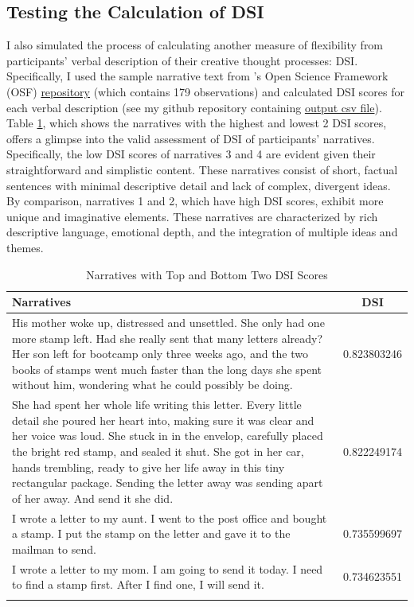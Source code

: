 \documentclass[../Proposal.tex]{subfiles}
\begin{document}
\subsection*{Testing the Calculation of DSI}
I also simulated the process of calculating another measure of flexibility from participants' verbal description of their creative thought processes: DSI. Specifically, I used the sample narrative text from \textcite{johnson_divergent_2022}'s Open Science Framework (OSF) \href{https://osf.io/ath2s/}{repository} (which contains 179 observations) and calculated DSI scores for each verbal description (see my github repository containing \href{https://github.com/cty20010831/UChicago_MA_Thesis_Divergent-Semantic-Integration/blob/bdd32706afb7ba8e72f07b3b10d1eaa9fe8b4331/user_text/DSI_output.csv.csv}{output csv file}). Table \ref{tab: narratives with top and bottom 2 DSI scores}, which shows the narratives with the highest and lowest 2 DSI scores, offers a glimpse into the valid assessment of DSI of participants' narratives. Specifically, the low DSI scores of narratives 3 and 4 are evident given their straightforward and simplistic content. These narratives consist of short, factual sentences with minimal descriptive detail and lack of complex, divergent ideas. By comparison, narratives 1 and 2, which have high DSI scores, exhibit more unique and imaginative elements. These narratives are characterized by rich descriptive language, emotional depth, and the integration of multiple ideas and themes. 

\begin{longtable}{|p{13cm}|c|}
    \hline
    Narratives & DSI \\ 
    \hline
    His mother woke up, distressed and unsettled. She only had one more stamp left. Had she really sent that many letters already? Her son left for bootcamp only three weeks ago, and the two books of stamps went much faster than the long days she spent without him, wondering what he could possibly be doing. & 0.823803246 \\ 
    \hline
    She had spent her whole life writing this letter. Every little detail she poured her heart into, making sure it was clear and her voice was loud. She stuck in in the envelop, carefully placed the bright red stamp, and sealed it shut. She got in her car, hands trembling, ready to give her life away in this tiny rectangular package. Sending the letter away was sending apart of her away. And send it she did. & 0.822249174 \\
    \hline
    I wrote a letter to my aunt. I went to the post office and bought a stamp. I put the stamp on the letter and gave it to the mailman to send. & 0.735599697 \\
    \hline
    I wrote a letter to my mom. I am going to send it today. I need to find a stamp first. After I find one, I will send it. & 0.734623551 \\
    \hline
    \caption{Narratives with Top and Bottom Two DSI Scores}
    \label{tab: narratives with top and bottom 2 DSI scores}
\end{longtable}
\end{document}
